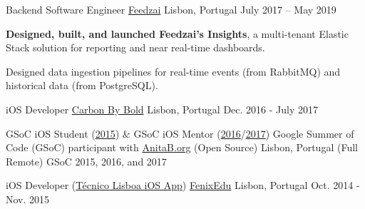 \begin{cventries}
  \cventry
    {Backend Software Engineer}
    {\href{https://feedzai.com/}{Feedzai}}
    {Lisbon, Portugal}
    {July 2017 – May 2019}
    {
      \begin{cvitems}
        \item \textbf{Designed, built, and launched Feedzai's Insights}, a multi-tenant Elastic Stack solution for reporting and near real-time dashboards.
        \item Designed data ingestion pipelines for real-time events (from RabbitMQ) and historical data (from PostgreSQL).
      \end{cvitems}
      \vspace{4mm}
    }


  \cventryShort
    {iOS Developer}
    {\href{https://www.carbonbybold.com/pt-pt/}{Carbon By Bold}}
    {Lisbon, Portugal}
    {Dec. 2016 - July 2017}


  \cventryShort
    {GSoC iOS Student (\href{https://docs.google.com/presentation/d/1yv4XuNNpTgDkyOjL9SSjGe7PSZuwpbah42mQCACxdXQ/}{2015}) \& GSoC iOS Mentor (\href{https://summerofcode.withgoogle.com/archive/2016/projects/5509901874888704/}{2016}/\href{https://summerofcode.withgoogle.com/archive/2017/projects/5508656065937408/}{2017})}
    {Google Summer of Code (GSoC) participant with \href{http://anitaborg.org/}{AnitaB.org} (Open Source)}
    {Lisbon, Portugal (Full Remote)}
    {GSoC 2015, 2016, and 2017}


  \cventryShort
    {iOS Developer (\href{https://apps.apple.com/us/app/tecnico-lisboa/id959976468}{Técnico Lisboa iOS App})}
    {\href{http://fenixedu.org/}{FenixEdu}}
    {Lisbon, Portugal}
    {Oct. 2014 - Nov. 2015}

\end{cventries}
